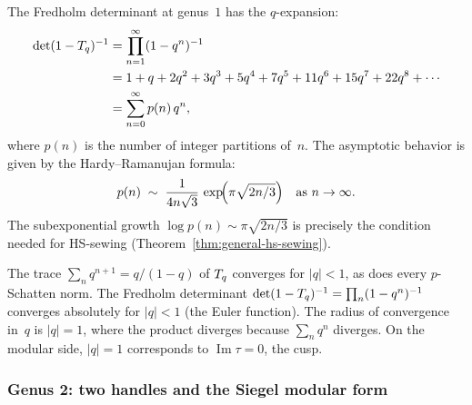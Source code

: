 \begin{computation}%
%
The Fredholm determinant at genus~$1$ has the $q$-expansion:
\begin{align}
\det(1 - T_q)^{-1}
&= \prod_{n=1}^{\infty} (1 - q^n)^{-1}
\notag\\
&= 1 + q + 2q^2 + 3q^3 + 5q^4 + 7q^5 + 11q^6 + 15q^7
+ 22q^8 + \cdots
\notag\\
&= \sum_{n=0}^{\infty} p(n)\,q^n,
\end{align}
where $p(n)$ is the number of integer partitions of~$n$.
The asymptotic behavior is given by the Hardy--Ramanujan formula:
\begin{equation}%
p(n) \;\sim\;
\frac{1}{4n\sqrt{3}}\,
\exp\!\Bigl(\pi\sqrt{2n/3}\Bigr)
\quad\text{as } n \to \infty.
\end{equation}
The subexponential growth $\log p(n) \sim \pi\sqrt{2n/3}$
is precisely the condition needed for HS-sewing
(Theorem~\ref{thm:general-hs-sewing}).
\end{computation}

\begin{remark}%
The trace $\sum_n q^{n+1} = q/(1-q)$ of $T_q$ converges
for $|q| < 1$, as does every $p$-Schatten norm.
The Fredholm determinant
$\det(1 - T_q)^{-1}
= \prod_n (1 - q^n)^{-1}$
converges absolutely for $|q| < 1$ (the Euler function).
The radius of convergence in~$q$ is $|q| = 1$, where the
product diverges because $\sum_n q^n$ diverges.
On the modular side, $|q| = 1$ corresponds to
$\operatorname{Im}\tau = 0$, the cusp.
\end{remark}

\subsubsection{Genus 2: two handles and the Siegel modular form}
\label{subsec:thqg-genus2-fredholm}%

